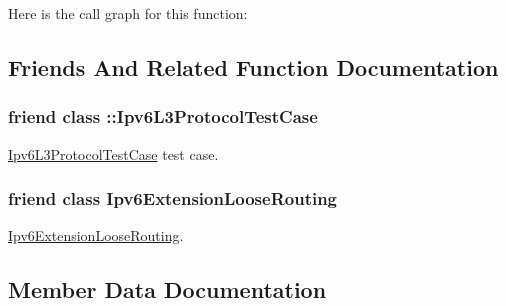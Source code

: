 Here is the call graph for this function\+:




\subsection{Friends And Related Function Documentation}
\subsubsection[{\texorpdfstring{\+::\+Ipv6\+L3\+Protocol\+Test\+Case}{::Ipv6L3ProtocolTestCase}}]{\setlength{\rightskip}{0pt plus 5cm}friend class \+::{\bf Ipv6\+L3\+Protocol\+Test\+Case}\hspace{0.3cm}{\ttfamily [friend]}}\hypertarget{classns3_1_1Ipv6L3Protocol_a09b6212a5017142b4f4244e3809708b9}{}\label{classns3_1_1Ipv6L3Protocol_a09b6212a5017142b4f4244e3809708b9}


\hyperlink{classIpv6L3ProtocolTestCase}{Ipv6\+L3\+Protocol\+Test\+Case} test case. 

\subsubsection[{\texorpdfstring{Ipv6\+Extension\+Loose\+Routing}{Ipv6ExtensionLooseRouting}}]{\setlength{\rightskip}{0pt plus 5cm}friend class {\bf Ipv6\+Extension\+Loose\+Routing}\hspace{0.3cm}{\ttfamily [friend]}}\hypertarget{classns3_1_1Ipv6L3Protocol_aa3cefd4bf01ad6e80cfae2da346cccc2}{}\label{classns3_1_1Ipv6L3Protocol_aa3cefd4bf01ad6e80cfae2da346cccc2}


\hyperlink{classns3_1_1Ipv6ExtensionLooseRouting}{Ipv6\+Extension\+Loose\+Routing}. 



\subsection{Member Data Documentation}
